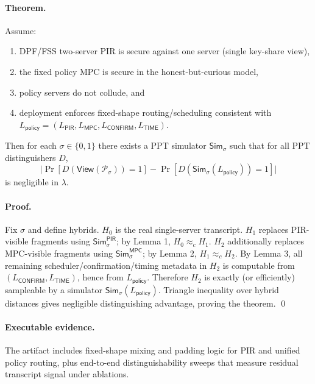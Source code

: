 \paragraph{Theorem.}
\begin{theorem}\label{thm:sap}
Assume:
\begin{enumerate}
\item DPF/FSS two-server PIR is secure against one server (single key-share view),
\item the fixed policy MPC is secure in the honest-but-curious model,
\item policy servers do not collude, and
\item deployment enforces fixed-shape routing/scheduling consistent with
$L_{\mathsf{policy}}=(L_{\mathsf{PIR}},L_{\mathsf{MPC}},L_{\mathsf{CONFIRM}},L_{\mathsf{TIME}})$.
\end{enumerate}
Then for each $\sigma \in \{0,1\}$ there exists a PPT simulator $\mathsf{Sim}_\sigma$ such that for
all PPT distinguishers $D$,
\[
\bigl|\Pr[D(\mathsf{View}(\mathcal{P}_\sigma))=1] - \Pr[D(\mathsf{Sim}_\sigma(L_{\mathsf{policy}}))=1]\bigr|
\]
is negligible in $\lambda$.
\end{theorem}

\paragraph{Proof.}
Fix $\sigma$ and define hybrids.
$H_0$ is the real single-server transcript.
$H_1$ replaces PIR-visible fragments using $\mathsf{Sim}^{\mathsf{PIR}}_\sigma$; by Lemma 1,
$H_0 \approx_c H_1$.
$H_2$ additionally replaces MPC-visible fragments using $\mathsf{Sim}^{\mathsf{MPC}}_\sigma$; by
Lemma 2, $H_1 \approx_c H_2$.
By Lemma 3, all remaining scheduler/confirmation/timing metadata in $H_2$ is computable from
$(L_{\mathsf{CONFIRM}},L_{\mathsf{TIME}})$, hence from $L_{\mathsf{policy}}$.
Therefore $H_2$ is exactly (or efficiently) sampleable by a simulator
$\mathsf{Sim}_\sigma(L_{\mathsf{policy}})$.
Triangle inequality over hybrid distances gives negligible distinguishing advantage, proving the
theorem.
\qed

\paragraph{Executable evidence.}
The artifact includes fixed-shape mixing and padding logic for PIR and unified policy routing,
plus end-to-end distinguishability sweeps that measure residual transcript signal under ablations.

